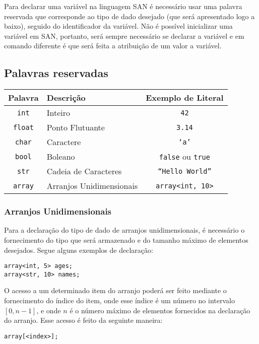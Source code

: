 \documentclass[a4paper,12pt]{article}
\begin{document}
Para declarar uma variável na linguagem SAN é necessário usar uma palavra reservada que
corresponde ao tipo de dado desejado (que será apresentado logo a baixo), seguido do
identificador da variável. Não é possível inicializar uma variável em SAN, portanto, será sempre
necessário se declarar a variável e em comando diferente é que será feita a atribuição de um valor
a variável.

\subsection{Palavras reservadas}
\begin{center}
    \begin{tabular}{|c|l|c|}
         \hline
         \textbf{Palavra} & \textbf{Descrição} & \textbf{Exemplo de Literal}\\
         \hline
         \texttt{int} & Inteiro & \texttt{42}\\
         \hline
         \texttt{float} & Ponto Flutuante & \texttt{3.14}\\
         \hline
         \texttt{char} & Caractere & \texttt{`a'}\\
         \hline
         \texttt{bool} & Boleano & \texttt{false} ou \texttt{true}\\
         \hline
         \texttt{str} & Cadeia de Caracteres & \texttt{``Hello World''}\\
         \hline
         \texttt{array} & Arranjos Unidimensionais & \texttt{array<int, 10>}\\
         \hline
    \end{tabular}
\end{center}

\subsubsection{Arranjos Unidimensionais}
Para a declaração do tipo de dado de arranjos unidimensionais, é necessário o fornecimento do
tipo que será armazenado e do tamanho máximo de elementos desejados. Segue alguns exemplos de
declaração:
\begin{lstlisting}
array<int, 5> ages;
array<str, 10> names;
\end{lstlisting}

O acesso a um determinado item do arranjo poderá ser feito mediante o fornecimento do índice
do item, onde esse índice é um número no intervalo $[0, n - 1]$, e onde $n$ é o número máximo de
elementos fornecidos na declaração do arranjo. Esse acesso é feito da seguinte maneira:
\begin{lstlisting}
array[<index>];
\end{lstlisting}
\end{document}
